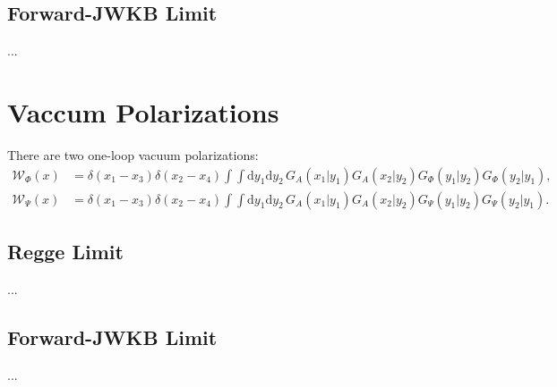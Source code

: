 \subsection{Forward-JWKB Limit}
...
\section{Vaccum Polarizations}
There are two one-loop vacuum polarizations:
\begin{align}
	\mathcal{W}_{\Phi}(x) &= \delta(x_{1} - x_{3}) \delta(x_{2} - x_{4}) \int \int \mathrm{d}y_{1} \mathrm{d}y_{2} \, G_{A}(x_{1} | y_{1}) G_{A}(x_{2}| y_{2}) G_{\Phi}(y_{1} | y_{2}) G_{\Phi}(y_{2}| y_{1}), \\
	\mathcal{W}_{\Psi}(x) &= \delta(x_{1} - x_{3}) \delta(x_{2} - x_{4}) \int \int \mathrm{d}y_{1} \mathrm{d}y_{2} \, G_{A}(x_{1} | y_{1}) G_{A}(x_{2}| y_{2}) G_{\Psi}(y_{1} | y_{2}) G_{\Psi}(y_{2}| y_{1}).
\end{align}
\subsection{Regge Limit}
...
\subsection{Forward-JWKB Limit}
...
